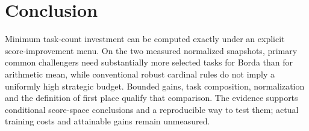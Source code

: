 \section{Conclusion}
Minimum task-count investment can be computed exactly under an explicit score-improvement menu. On the two measured normalized snapshots, primary common challengers need substantially more selected tasks for Borda than for arithmetic mean, while conventional robust cardinal rules do not imply a uniformly high strategic budget. Bounded gains, task composition, normalization and the definition of first place qualify that comparison. The evidence supports conditional score-space conclusions and a reproducible way to test them; actual training costs and attainable gains remain unmeasured.

